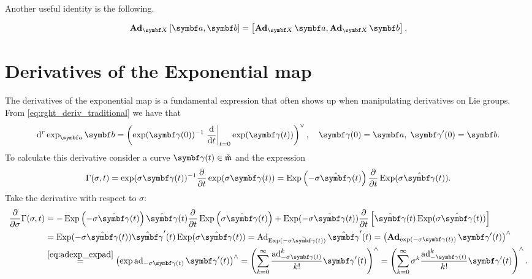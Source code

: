 Another useful identity is the following.
\begin{important}
  \begin{equation}
    \bAd_\X \left[ \a, \b \right] = \left[ \bAd_\X \a, \bAd_\X \b \right].
  \end{equation}
\end{important}
\section{Derivatives of the Exponential map}

The derivatives of the exponential map is a fundamental expression that often shows up when manipulating derivatives on Lie groups. From \eqref{eq:rght_deriv_traditional} we have that
\begin{equation}
  \mathrm{d}^r \exp_\a \b = \left( \exp(\bgamma(0))^{-1} \left. \frac{\mathrm{d}}{\mathrm{d}t}\right|_{t = 0} \exp(\bgamma(t)) \right)^\vee, \quad \bgamma(0) = \a, \; \bgamma'(0) = \b.
\end{equation}
To calculate this derivative consider a curve $\bgamma(t) \in \check{\mathfrak{m}}$ and the expression
\begin{equation}
  \label{eq:exponential_derivative_posit}
  \Gamma(\sigma, t) = \exp(\sigma \bgamma(t))^{-1} \frac{\partial}{\partial t}  \exp(\sigma \bgamma(t)) = \Exp \left( - \sigma \hat \bgamma(t) \right) \frac{\partial}{\partial t}  \Exp(\sigma \hat \bgamma(t)).
\end{equation}
Take the derivative with respect to $\sigma$:
\begin{equation}
  \begin{aligned}
    \frac{\partial}{\partial \sigma} \Gamma(\sigma, t)
     & = -\Exp \left(-\sigma \hat \bgamma(t) \right) \hat \bgamma(t) \frac{\partial}{\partial t} \Exp \left(\sigma \hat \bgamma(t) \right) + \Exp(-\sigma \hat \bgamma(t)) \frac{\partial}{ \partial t} \left[ \hat \bgamma(t) \Exp (\sigma \hat \bgamma(t)) \right]                             \\
     & = \Exp(-\sigma \hat \bgamma(t)) \hat \bgamma'(t) \Exp(\sigma \hat \bgamma(t)) = \Ad_{\Exp (- \sigma \hat \bgamma(t))}\hat \bgamma'(t) = \left(
    \bAd_{\exp(-\sigma \bgamma(t))} \bgamma'(t) \right)^\wedge                                                                                                                                                                                                                                   \\
     & \overset{\eqref{eq:adexp_expad}}= \left( \exp \ad_{-\sigma \bgamma(t)}\bgamma'(t) \right)^\wedge = \left( \sum_{k=0}^\infty \frac{\ad^k_{-\sigma \bgamma(t)}}{k!}\bgamma'(t) \right)^\wedge = \left( \sum_{k=0}^\infty \sigma^k \frac{\ad^k_{-\bgamma(t)}}{k!}\bgamma'(t) \right)^\wedge.
  \end{aligned}
\end{equation}

